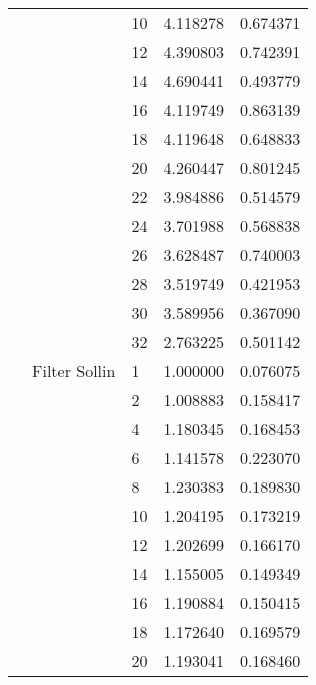 \begin{tabular}{lllrr}
                      &                     & 10 &  4.118278 &  0.674371 \\
                      &                     & 12 &  4.390803 &  0.742391 \\
                      &                     & 14 &  4.690441 &  0.493779 \\
                      &                     & 16 &  4.119749 &  0.863139 \\
                      &                     & 18 &  4.119648 &  0.648833 \\
                      &                     & 20 &  4.260447 &  0.801245 \\
                      &                     & 22 &  3.984886 &  0.514579 \\
                      &                     & 24 &  3.701988 &  0.568838 \\
                      &                     & 26 &  3.628487 &  0.740003 \\
                      &                     & 28 &  3.519749 &  0.421953 \\
                      &                     & 30 &  3.589956 &  0.367090 \\
                      &                     & 32 &  2.763225 &  0.501142 \\
                      & Filter Sollin & 1  &  1.000000 &  0.076075 \\
                      &                     & 2  &  1.008883 &  0.158417 \\
                      &                     & 4  &  1.180345 &  0.168453 \\
                      &                     & 6  &  1.141578 &  0.223070 \\
                      &                     & 8  &  1.230383 &  0.189830 \\
                      &                     & 10 &  1.204195 &  0.173219 \\
                      &                     & 12 &  1.202699 &  0.166170 \\
                      &                     & 14 &  1.155005 &  0.149349 \\
                      &                     & 16 &  1.190884 &  0.150415 \\
                      &                     & 18 &  1.172640 &  0.169579 \\
                      &                     & 20 &  1.193041 &  0.168460 \\

\end{tabular}
